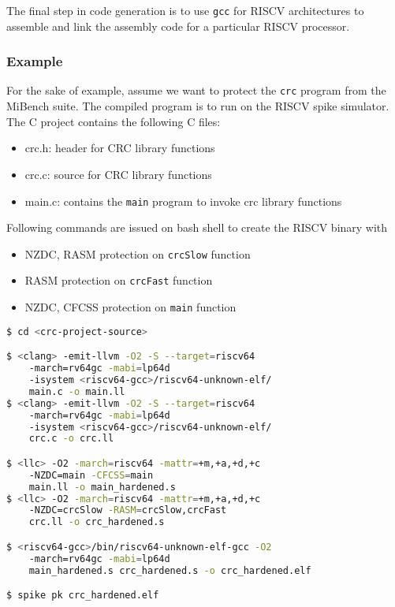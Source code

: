 The final step in code generation is to use \texttt{gcc} for RISCV architectures to assemble and link the
assembly code for a particular RISCV processor.

\subsubsection{Example}
For the sake of example, assume we want to protect the \texttt{crc} program from the MiBench suite. The
compiled program is to run on the RISCV spike simulator. The C project contains the following C files:

\begin{itemize}
 \item{crc.h: header for CRC library functions}
 \item{crc.c: source for CRC library functions}
 \item{main.c: contains the \texttt{main} program to invoke crc library functions}
\end{itemize}

Following commands are issued on bash shell to create the RISCV binary with
\begin{itemize}
 \item NZDC, RASM protection on \texttt{crcSlow} function
 \item RASM protection on \texttt{crcFast} function
 \item NZDC, CFCSS protection on \texttt{main} function
\end{itemize}

\begin{framed}
 \begin{lstlisting}[language=bash, basicstyle=\small\ttfamily]
$ cd <crc-project-source>

$ <clang> -emit-llvm -O2 -S --target=riscv64
    -march=rv64gc -mabi=lp64d
    -isystem <riscv64-gcc>/riscv64-unknown-elf/
    main.c -o main.ll
$ <clang> -emit-llvm -O2 -S --target=riscv64
    -march=rv64gc -mabi=lp64d
    -isystem <riscv64-gcc>/riscv64-unknown-elf/
    crc.c -o crc.ll

$ <llc> -O2 -march=riscv64 -mattr=+m,+a,+d,+c
    -NZDC=main -CFCSS=main
    main.ll -o main_hardened.s
$ <llc> -O2 -march=riscv64 -mattr=+m,+a,+d,+c
    -NZDC=crcSlow -RASM=crcSlow,crcFast
    crc.ll -o crc_hardened.s

$ <riscv64-gcc>/bin/riscv64-unknown-elf-gcc -O2
    -march=rv64gc -mabi=lp64d
    main_hardened.s crc_hardened.s -o crc_hardened.elf

$ spike pk crc_hardened.elf

\end{lstlisting}
\end{framed}

